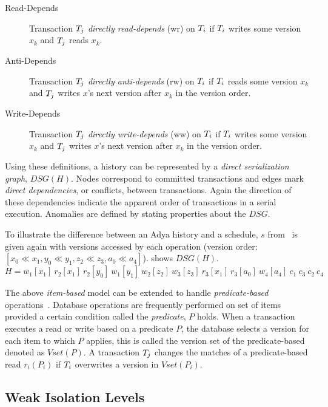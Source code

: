 \begin{description}
\item[Read-Depends]
  Transaction $T_j$ \emph{directly read-depends} (\textsf{wr}) on $T_i$ if
  $T_i$ writes some version $x_k$ and $T_j$ reads $x_k$.
\item[Anti-Depends]
  Transaction $T_j$ \emph{directly anti-depends} (\textsf{rw}) on $T_i$ if
  $T_i$ reads some version $x_k$ and $T_j$ writes $x$'s next version after
  $x_k$ in the version order.
\item[Write-Depends]
  Transaction $T_j$ \emph{directly write-depends} (\textsf{ww}) on $T_i$ if
  $T_i$ writes some version $x_k$ and $T_j$ writes $x$'s next version after
  $x_k$ in the version order.
\end{description}

Using these definitions, a history can be represented by a \emph{direct serialization graph}, $DSG(H)$.
Nodes correspond to committed transactions and edges mark \emph{direct dependencies}, or conflicts, between 
transactions. Again the direction of these dependencies indicate the apparent order of transactions in a 
serial execution. Anomalies are defined by stating properties about the $DSG$.

To illustrate the difference between an Adya history and a schedule, $s$ from~ is given
again with versions accessed by each operation (version order: $[x_0\ll x_1,y_0\ll y_1,z_2\ll z_3,a_0\ll a_4]$).  shows $DSG(H)$.
$$ H = w_1 [x_1] \ r_2 [x_1] \ r_2 [y_0] \ w_1 [y_1] \ w_2[z_2] \ w_3[z_3] \ r_3 [x_1] \ r_3 [a_0] \ w_4 [a_4] \ c_1 \ c_3 \ c_2 \ c_4 $$
  


The above \emph{item-based} model can be extended to handle
\emph{predicate-based} operations~\cite{adya1999weak}. Database operations are
frequently performed on set of items provided a certain condition called the
\emph{predicate}, $P$ holds. When a transaction executes a read or write based on a
predicate $P$, the database selects a version for each item to which $P$ applies, this is
called the version set of the predicate-based denoted as $\textit{Vset}(P)$. A
transaction $T_j$ changes the matches of a predicate-based read $r_i(P_i)$ if
$T_i$ overwrites a version in $\textit{Vset}(P_i)$.

\subsection{Weak Isolation Levels}
\label{sec:weak-isolation}

